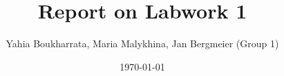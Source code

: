 \documentclass[11pt,a4paper]{article}
\begin{document}
\title{\textbf{Report on Labwork 1}}
\author{Yahia Boukharrata, Maria Malykhina, Jan Bergmeier (Group 1)}
\date{\today}
\maketitle
\tableofcontents
\listoffigures
\listoftables

\newpage


\newpage

\newpage

\newpage

\end{document}
